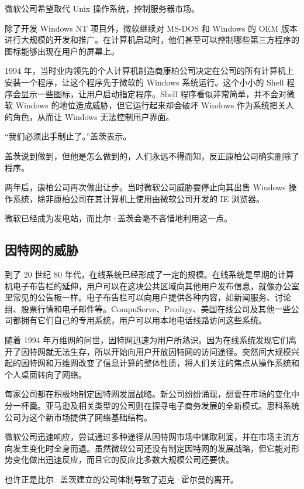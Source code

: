 \documentclass[12pt,UTF8]{ctexbook}
\begin{document}
微软公司希望取代 Unix 操作系统，控制服务器市场。

除了开发 Windows NT 项目外，微软继续对 MS-DOS 和 Windows 的 OEM 版本进行大规模的开发和推广。在计算机启动时，他们甚至可以控制哪些第三方程序的图标能够出现在用户的屏幕上。

1994 年，当时业内领先的个人计算机制造商康柏公司决定在公司的所有计算机上安装一个程序，让这个程序先于微软的 Windows 系统运行。这个小小的 Shell 程序会显示一些图标，让用户启动指定程序。Shell 程序看似非常简单，并不会对微软 Windows 的地位造成威胁，但它运行起来却会破坏 Windows 作为系统把关人的角色，从而让 Windows 无法控制用户界面。

“我们必须出手制止了。”盖茨表示。

盖茨说到做到，但他是怎么做到的，人们永远不得而知，反正康柏公司确实删除了程序。

两年后，康柏公司再次做出让步。当时微软公司威胁要停止向其出售 Windows 操作系统，除非康柏公司在其计算机上使用由微软公司开发的 IE 浏览器。

微软已经成为发电站，而比尔·盖茨会毫不吝惜地利用这一点。





\subsection{因特网的威胁}


到了 20 世纪 80 年代，在线系统已经形成了一定的规模。在线系统是早期的计算机电子布告栏的延伸，用户可以在这块公共区域向其他用户发布信息，就像办公室里常见的公告板一样。电子布告栏可以向用户提供各种内容，如新闻服务、讨论组、股票行情和电子邮件等。CompuServe、Prodigy、美国在线公司及其他一些公司都拥有它们自己的专用系统，用户可以用本地电话线路访问这些系统。

随着 1994 年万维网的问世，因特网迅速为用户所熟识。因为在线系统发现它们离开了因特网就无法生存，所以开始向用户开放因特网的访问途径。突然间大规模兴起的因特网和万维网改变了信息计算的整体性质，将人们关注的焦点从操作系统和个人桌面转向了网络。

每家公司都在积极地制定因特网发展战略。新公司纷纷涌现，想要在市场的变化中分一杯羹。亚马逊及相关类型的公司则在探寻电子商务发展的全新模式。思科系统公司为这个新市场提供了网络基础结构。

微软公司迅速响应，尝试通过多种途径从因特网市场中谋取利润，并在市场主流方向发生变化时全身而退。虽然微软公司还没有制定因特网的发展战略，但它能对形势变化做出迅速反应，而且它的反应比多数大规模公司还要快。

也许正是比尔·盖茨建立的公司体制导致了迈克·霍尔曼的离开。
\end{document}
